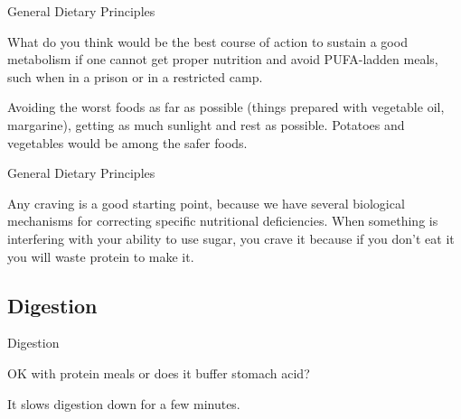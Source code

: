 \documentclass[11pt,oneside,openany,extrafontsizes]{memoir}
\begin{document}
\begin{qaexchange}{General Dietary Principles}

    \begin{question}
        What do you think would be the best course of action to sustain a good metabolism if one cannot get proper nutrition and avoid PUFA-ladden meals, such when in a prison or in a restricted camp. 
    \end{question}

    \begin{answer}
      Avoiding the worst foods as far as possible (things prepared with vegetable oil, margarine), getting as much sunlight and rest as possible. Potatoes and vegetables would be among the safer foods.
    \end{answer}
\end{qaexchange}

\begin{standalonequote}{General Dietary Principles}

    \begin{answer}
      Any craving is a good starting point, because we have several biological mechanisms for correcting specific nutritional deficiencies. When something is interfering with your ability to use sugar, you crave it because if you don't eat it you will waste protein to make it.
    \end{answer}
\end{standalonequote}

\subsection{Digestion}

\begin{qaexchange}{Digestion}

    \begin{question}
        OK with protein meals or does it buffer stomach acid?
    \end{question}

    \begin{answer}
        It slows digestion down for a few minutes.
    \end{answer}
\end{qaexchange}
\end{document}
